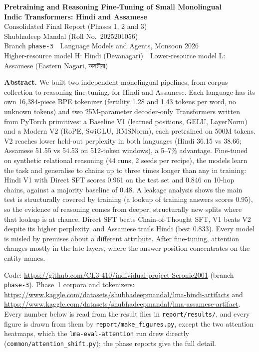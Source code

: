 \documentclass[11pt,a4paper]{article}
\newcommand{\indic}[1]{{\indicfont #1}}
\begin{document}
\begin{center}
{\sffamily\bfseries\Large Pretraining and Reasoning Fine-Tuning of Small Monolingual\\[2pt]
Indic Transformers: Hindi and Assamese}\\[8pt]
{\normalsize Consolidated Final Report (Phases 1, 2 and 3)}\\[8pt]
Shubhadeep Mandal \; (Roll No.\ 2025201056)\\
\small Branch \texttt{phase-3} \,\textbullet\, Language Models and Agents, Monsoon 2026\\[2pt]
\footnotesize Higher-resource model H: Hindi (Devanagari) \,\textbullet\, Lower-resource model L: Assamese (Eastern Nagari, \indic{অসমীয়া})
\end{center}
\vspace{-2pt}

\noindent\textbf{Abstract.}
We built two independent monolingual pipelines, from corpus collection to reasoning fine-tuning, for Hindi and Assamese. Each language has its own 16,384-piece BPE tokenizer (fertility 1.28 and 1.43 tokens per word, no unknown tokens) and two 25M-parameter decoder-only Transformers written from PyTorch primitives: a Baseline V1 (learned positions, GELU, LayerNorm) and a Modern V2 (RoPE, SwiGLU, RMSNorm), each pretrained on 500M tokens. V2 reaches lower held-out perplexity in both languages (Hindi 36.15 vs 38.66; Assamese 51.55 vs 54.53 on 512-token windows), a 5--7\% advantage. Fine-tuned on synthetic relational reasoning (44 runs, 2 seeds per recipe), the models learn the task and generalise to chains up to three times longer than any in training: Hindi V1 with Direct SFT scores 0.961 on the test set and 0.846 on 10-hop chains, against a majority baseline of 0.48. A leakage analysis shows the main test is structurally covered by training (a lookup of training answers scores 0.95), so the evidence of reasoning comes from deeper, structurally new splits where that lookup is at chance. Direct SFT beats Chain-of-Thought SFT, V1 beats V2 despite its higher perplexity, and Assamese trails Hindi (best 0.833). Every model is misled by premises about a different attribute. After fine-tuning, attention changes mostly in the late layers, where the answer position concentrates on the entity names.

\vspace{2pt}
\noindent\footnotesize Code: \url{https://github.com/CL3-410/individual-project-Seronic2001} (branch \texttt{phase-3}). Phase~1 corpora and tokenizers: \url{https://www.kaggle.com/datasets/shubhadeepmandal/lma-hindi-artifacts} and \url{https://www.kaggle.com/datasets/shubhadeepmandal/lma-assamese-artifact}. Every number below is read from the result files in \texttt{report/results/}, and every figure is drawn from them by \texttt{report/make\_figures.py}, except the two attention heatmaps, which the \texttt{lma-eval-attention} run drew directly (\texttt{common/attention\_shift.py}); the phase reports give the full detail.
\normalsize
\end{document}
